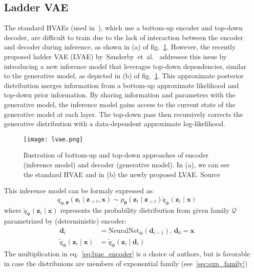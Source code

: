 \subsection{Ladder VAE}
The standard HVAEs (used in~\cite{vae-original-2013,iaf-2016,renedze-backprop-2014}), which use a bottom-up encoder and top-down decoder, are
difficult to train due to the lack of interaction between the encoder and decoder during inference, as shown in (a) of fig.~\ref{fig:lvae}. 
However, the recently proposed ladder VAE (LVAE) by~Sønderby~et~al.~\cite{lvae-2016} addresses this issue by introducing a new inference model
that leverages top-down dependencies, similar to the generative model, as depicted in (b) of fig.~\ref{fig:lvae}. This approximate posterior 
distribution merges information from a bottom-up approximate likelihood and top-down prior information. By sharing information and parameters 
with the generative model, the inference model gains access to the current state of the generative model at each layer. The top-down pass then
recursively corrects the generative distribution with a data-dependent approximate log-likelihood.
\begin{figure}[t]
    \centering
    \texttt{[image: lvae.png]}
    \caption[Ladder VAE]{Ilustration of bottom-up and top-down approaches of encoder (inference model) and decoder (generative model). In (a), we can see the standard HVAE and in (b) the newly proposed LVAE.
    Source~\cite{lvae-2016}}
    \label{fig:lvae}
\end{figure}
This inference model can be formaly expressed as:
\begin{equation}
q_{\boldsymbol{\phi},\boldsymbol{\theta}}(\boldsymbol{z}_{t}\mid\boldsymbol{z}_{>t}, \boldsymbol{x}) \sim p_{\boldsymbol{\theta}}(\boldsymbol{z}_{t}\mid\boldsymbol{z}_{>t})\tilde{q}_{\boldsymbol{\phi}}(\boldsymbol{z}_i \mid \boldsymbol{x}) \label{eq:lvae_encoder}
\end{equation}
where $\tilde{q}_{\boldsymbol{\phi}}(\boldsymbol{z}_i \mid \boldsymbol{x})$ represents the probability distribution from given family $\mathcal{Q}$ parametrized by (deterministic) encoder:
\begin{align*}
\boldsymbol{d}_i &= \mathrm{NeuralNet}_{\boldsymbol{\phi}} (\boldsymbol{d}_{i-1}) , \, \boldsymbol{d}_0 = \boldsymbol{x} \\
\tilde{q}_{\boldsymbol{\phi}}(\boldsymbol{z}_i \mid \boldsymbol{x}) &= \tilde{q}_{\boldsymbol{\phi}}(\boldsymbol{z}_i \mid \boldsymbol{d}_i )
\end{align*}
The multiplication in eq.~\ref{eq:lvae_encoder} is a choice of authors, but is favorable in case the distribuions are members of exponential family (see~\ref{sec:exp_family})
